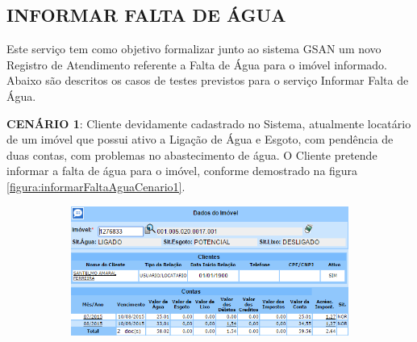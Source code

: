 \begin{flushleft}
\end{flushleft}


\subsection{\textbf{\uppercase{Informar Falta de Água}}}
Este serviço tem como objetivo formalizar junto ao sistema GSAN um novo Registro de Atendimento referente a Falta de Água para o imóvel informado.
Abaixo são descritos os casos de testes previstos para o serviço Informar Falta de Água.
\begin{flushleft}
	\begin{description}
		\item \textbf{CENÁRIO 1}: Cliente devidamente cadastrado no Sistema, atualmente locatário de um imóvel que possui ativo a Ligação de Água e Esgoto, com pendência de duas contas, com problemas no abastecimento de água. O Cliente pretende informar a falta de água para o imóvel, conforme demostrado na figura \ref{figura:informarFaltaAguaCenario1}.
		\begin{figure}[H]
			\centering
			\caption{\textbf{Informar Falta de Água - Cenário de Teste 1}}
			\label{figura:informarFaltaAguaCenario1}
			\begin{subfigure}[H]{\textwidth}
				\centering
				\includegraphics{figuras/cenarios/informar_falta_agua/cenario_1.PNG}
			\end{subfigure}
		\end{figure}
	\end{description}
	

\end{flushleft}
